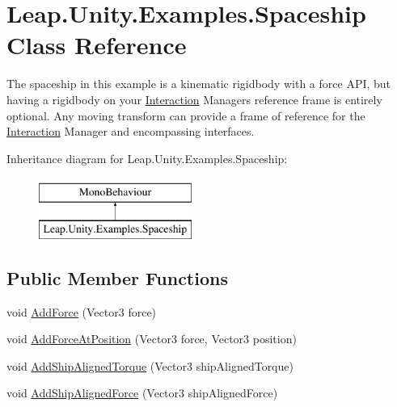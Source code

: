 \hypertarget{class_leap_1_1_unity_1_1_examples_1_1_spaceship}{}\section{Leap.\+Unity.\+Examples.\+Spaceship Class Reference}
\label{class_leap_1_1_unity_1_1_examples_1_1_spaceship}


The spaceship in this example is a kinematic rigidbody with a force A\+PI, but having a rigidbody on your \mbox{\hyperlink{namespace_leap_1_1_unity_1_1_interaction}{Interaction}} Manager\textquotesingle{}s reference frame is entirely optional. Any moving transform can provide a frame of reference for the \mbox{\hyperlink{namespace_leap_1_1_unity_1_1_interaction}{Interaction}} Manager and encompassing interfaces.  


Inheritance diagram for Leap.\+Unity.\+Examples.\+Spaceship\+:\begin{figure}[H]
\begin{center}
\leavevmode
\includegraphics[height=2.000000cm]{class_leap_1_1_unity_1_1_examples_1_1_spaceship}
\end{center}
\end{figure}
\subsection*{Public Member Functions}
\begin{DoxyCompactItemize}
\item 
void \mbox{\hyperlink{class_leap_1_1_unity_1_1_examples_1_1_spaceship_a9a263aa09c845c7a17303f7dde6c0254}{Add\+Force}} (Vector3 force)
\item 
void \mbox{\hyperlink{class_leap_1_1_unity_1_1_examples_1_1_spaceship_a47a880f577cb1fead6e5606acb05e456}{Add\+Force\+At\+Position}} (Vector3 force, Vector3 position)
\item 
void \mbox{\hyperlink{class_leap_1_1_unity_1_1_examples_1_1_spaceship_ad8f932ac8f92aa063fa7855b8616c204}{Add\+Ship\+Aligned\+Torque}} (Vector3 ship\+Aligned\+Torque)
\item 
void \mbox{\hyperlink{class_leap_1_1_unity_1_1_examples_1_1_spaceship_a1e08f5f7108281adb9deab1c2af31f9e}{Add\+Ship\+Aligned\+Force}} (Vector3 ship\+Aligned\+Force)
\end{DoxyCompactItemize}
